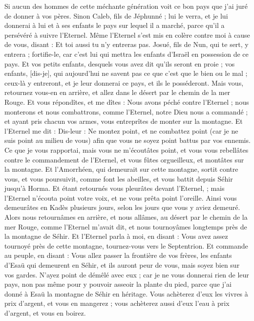 \begin{multicols}{2}
Si aucun des hommes de cette méchante génération voit ce bon pays que j'ai juré de donner à vos pères.
Sinon Caleb, fils de Jéphunné ; lui le verra, et je lui donnerai à lui et à ses enfants le pays sur lequel il a marché, parce qu'il a persévéré à suivre l'Eternel.
Même l'Eternel s'est mis en colère contre moi à cause de vous, disant : Et toi aussi tu n'y entreras pas.
Josué, fils de Nun, qui te sert, y entrera ; fortifie-le, car c'est lui qui mettra les enfants d'Israël en possession de ce pays.
Et vos petits enfants, desquels vous avez dit qu'ils seront en proie ; vos enfants, [dis-je], qui aujourd'hui ne savent pas ce que c'est que le bien ou le mal ; ceux-là y entreront, et je leur donnerai ce pays, et ils le posséderont.
Mais vous, retournez vous-en en arrière, et allez dans le désert par le chemin de la mer Rouge.
Et vous répondîtes, et me dîtes : Nous avons péché contre l'Eternel ; nous monterons et nous combattrons, comme l'Eternel, notre Dieu nous a commandé ; et ayant pris chacun vos armes, vous entreprîtes de monter sur la montagne.
Et l'Eternel me dit : Dis-leur : Ne montez point, et ne combattez point (car je ne suis point au milieu de vous) afin que vous ne soyez point battus par vos ennemis.
Ce que je vous rapportai, mais vous ne m'écoutâtes point, et vous vous rebellâtes contre le commandement de l'Eternel, et vous fûtes orgueilleux, et montâtes sur la montagne.
Et l'Amorrhéen, qui demeurait sur cette montagne, sortit contre vous, et vous poursuivit, comme font les abeilles, et vous battit depuis Séhir jusqu'à Horma.
Et étant retournés vous pleurâtes devant l'Eternel, ; mais l'Eternel n'écouta point votre voix, et ne vous prêta point l'oreille.
Ainsi vous demeurâtes en Kadès plusieurs jours, selon les jours que vous y aviez demeuré.
\VerseOne{}Alors nous retournâmes en arrière, et nous allâmes, au désert par le chemin de la mer Rouge, comme l'Eternel m'avait dit, et nous tournoyâmes longtemps près de la montagne de Séhir.
Et l'Eternel parla à moi, en disant :
Vous avez assez tournoyé près de cette montagne, tournez-vous vers le Septentrion.
Et commande au peuple, en disant : Vous allez passer la frontière de vos frères, les enfants d'Esaü qui demeurent en Séhir, et ils auront peur de vous, mais soyez bien sur vos gardes.
N'ayez point de démêlé avec eux ; car je ne vous donnerai rien de leur pays, non pas même pour y pouvoir asseoir la plante du pied, parce que j'ai donné à Esaü la montagne de Séhir en héritage.
Vous achèterez d'eux les vivres à prix d'argent, et vous en mangerez ; vous achèterez aussi d'eux l'eau à prix d'argent, et vous en boirez.

\end{multicols}
